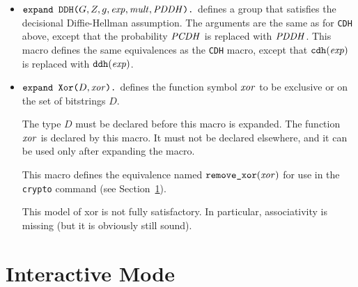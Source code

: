 \documentclass{article}
\begin{document}
\begin{itemize}
\item $\texttt{expand\ DDH(}G, Z, g, \mathit{exp}, \mathit{mult},
  \mathit{PDDH}\texttt{).}$ defines a group that satisfies the decisional
  Diffie-Hellman assumption. The arguments are the same as for
  \texttt{CDH} above, except that the probability $\mathit{PCDH}$ is
  replaced with $\mathit{PDDH}$. This macro defines the same equivalences
as the \texttt{CDH} macro, except that $\texttt{cdh}(\mathit{exp})$ is replaced
with $\texttt{ddh}(\mathit{exp})$.

\item $\texttt{expand\ Xor(}D, \mathit{xor}\texttt{).}$ defines the
  function symbol $\mathit{xor}$ to be exclusive or on the set of
  bitstrings $D$.

   The type $D$ must be declared before this macro is expanded. The
   function $\mathit{xor}$ is declared by this macro. It must not be
   declared elsewhere, and it can be used only after expanding the
   macro.

   This macro defines the equivalence named $\texttt{remove\_xor}(\mathit{xor})$
   for use in the \texttt{crypto} command 
   (see Section~\ref{sec:interact}).

   This model of xor is not fully satisfactory. In particular,
   associativity is missing (but it is obviously still sound).

\end{itemize}


\section{Interactive Mode}\label{sec:interact}
\end{document}
